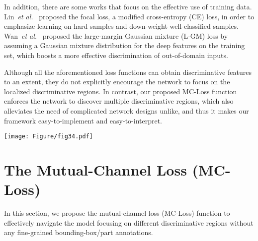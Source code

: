 \documentclass[journal]{IEEEtran}
\begin{document}
In addition, there are some works that focus on the effective use of training data. Lin~\emph{et al.}~\cite{lin2017focal} proposed the focal loss, a modified cross-entropy (CE) loss, in order to emphasize learning on hard samples and down-weight well-classified samples. Wan~\emph{et al.}~\cite{wan2018rethinking} proposed the large-margin Gaussian mixture (L-GM) loss by assuming a Gaussian mixture distribution for the deep features on the training set, which boosts a more effective discrimination of out-of-domain inputs.

Although all the aforementioned loss functions can obtain discriminative features to an extent, they do not explicitly encourage the network to focus on the localized discriminative regions. In contrast, our proposed MC-Loss function enforces the network to discover multiple discriminative regions, which also alleviates the need of complicated network designs unlike\cite{zhang2016picking,wang2015multiple,zheng2017learning}, and thus it makes our framework easy-to-implement and easy-to-interpret.









\begin{figure*}[!t]
  \begin{center}
    \texttt{[image: Figure/fig34.pdf]}
  \end{center}
  \caption{(a) Overview of the MC-Loss. The MC-Loss consists of (i) a discriminality component (left) that makes  to be class-aligned and discriminative, and (ii) a diversity component (right) that supervises the feature channels to focus on different local regions. (b) Comparison of feature maps before (left) and after (right) applying MC-Loss, where feature channels become class aligned, and each attending to different discriminate parts.~\textbf{Please refer to Section~\ref{Methods} for details.}
  }
  \label{fig:MCloss}
\end{figure*}

\section{The Mutual-Channel Loss (MC-Loss)}\label{Methods}




In this section, we propose the mutual-channel loss (MC-Loss) function to effectively navigate the model focusing on different discriminative regions without any fine-grained bounding-box/part annotations.
\end{document}
